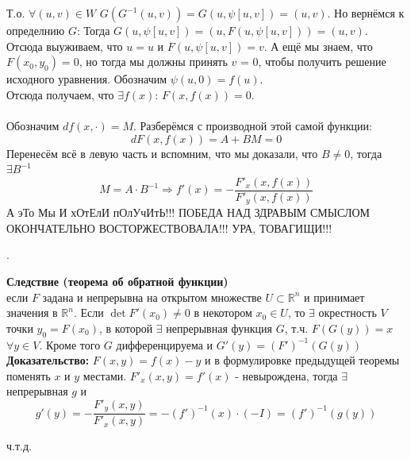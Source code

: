 \documentclass[book, 11pt]{report}
\begin{document}
{Т.о. $\forall(u,v)\in W$ $G(G^{-1}(u,v))=G(u,\psi[u,v])=(u,v)$. Но вернёмся к определнию $G$: Тогда $G(u,\psi[u,v])=(u,F(u,\psi[u,v]))=(u,v)$. \\
Отсюда выуживаем, что $u=u$ и $F(u,\psi[u,v])=v$. А ещё мы знаем, что $F(x_0,y_0)=0$, но тогда мы должны принять $v$ = 0, чтобы получить решение исходного уравнения. Обозначим $\psi(u,0)=f(u)$.\\
Отсюда получаем, что $\exists f(x)$: $F(x,f(x))=0$.\\ \\
Обозначим $df(x,\cdot)=M$.
Разберёмся с производной этой самой функции:
\begin{equation}
    dF(x,f(x))=A+BM=0
\end{equation}
Перенесём всё в левую часть и вспомним, что мы доказали, что $B\ne0$, тогда $\exists B^{-1}$
\begin{equation}
    M=A\cdot B^{-1}\Rightarrow f'(x)=-\frac{F'_x(x,f(x))}{F'_y(x,f(x))}
\end{equation}
А эТо Мы И хОтЕлИ пОлУчИтЬ!!! ПОБЕДА НАД ЗДРАВЫМ СМЫСЛОМ ОКОНЧАТЕЛЬНО ВОСТОРЖЕСТВОВАЛА!!! УРА, ТОВАГИЩИ!!!}
\par{{\raggedleft {}.\par}}
\setcounter{equation}{0}
\vspace{0.8cm}
\par{\textbf{Следствие (теорема об обратной функции)}\\
если $F$ задана и непрерывна на открытом множестве $U\subset\mathbb{R}^n$ и принимает значения в $\mathbb{R}^n$. Если $\det F'(x_0)\ne0$ в некотором $x_0\in U$, то $\exists$ окрестность $V$ точки $y_0=F(x_0)$, в которой $\exists$ непрерывная функция $G$, т.ч. $F(G(y))=x$ $\forall y\in V$. Кроме того $G$ дифференцируема и $G'(y)=(F')^{-1}(G(y))$ \\
\textbf{Доказательство: } $F(x,y)=f(x)-y$ и в формулировке предыдущей теоремы поменять $x$ и $y$ местами. $F'_x(x,y)=f'(x)$ - невырождена, тогда $\exists$ непрерывная $g$ и
\begin{equation*}
    g'(y)=-\frac{F'_y(x,y)}{F'_x(x,y)}=-(f')^{-1}(x)\cdot(-I)=(f')^{-1}(g(y))
\end{equation*}
}
\par{{\raggedleft ч.т.д.\par}}
\vspace{0.5cm}
\end{document}
